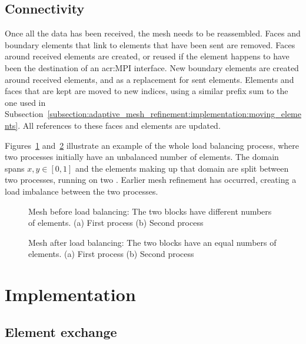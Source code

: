 \subsection{Connectivity}\label{subsection:load_balancing:reconstruction:connectivity}

Once all the data has been received, the mesh needs to be reassembled. Faces and boundary elements
that link to elements that have been sent are removed. Faces around received elements are created,
or reused if the element happens to have been the destination of an \acrshort{acr:MPI} interface.
New boundary elements are created around received elements, and as a replacement for sent elements.
Elements and faces that are kept are moved to new indices, using a similar prefix sum to the one
used in Subsection~\ref{subsection:adaptive_mesh_refinement:implementation:moving_elements}. All
references to these faces and elements are updated.

Figures~\ref{fig:lb_before} and~\ref{fig:lb_after} illustrate an example of the whole load balancing
process, where two processes initially have an unbalanced number of elements. The domain spans \(x,
y \in [0, 1]\) and the elements making up that domain are split between two processes, running on
two . Earlier mesh refinement has occurred, creating a load imbalance between
the two processes.

\begin{figure}[H]
	\centering
	\subfloat[Process 0]
	{\label{fig:lb_before_0}}
	\hfill
	\subfloat[Process 1]
	{\label{fig:lb_before_1}}
	\caption{Mesh before load balancing: The two blocks have different numbers of elements. (a) First process (b) Second process}\label{fig:lb_before}
\end{figure}

\begin{figure}[H]
	\centering
	\subfloat[Process 0]
	{\label{fig:lb_after_0}}
	\hfill
	\subfloat[Process 1]
	{\label{fig:lb_after_1}}
	\caption{Mesh after load balancing: The two blocks have an equal numbers of elements. (a) First process (b) Second process}\label{fig:lb_after}
\end{figure}

\section{Implementation}\label{section:load_balancing:implementation}

\subsection{Element exchange}\label{subsection:load_balancing:implementation:element_exchange}
